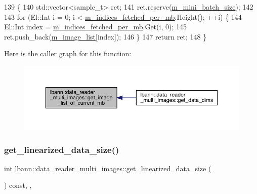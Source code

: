 \begin{DoxyCode}
139                                                                                                          \{
140   std::vector<sample\_t> ret;
141   ret.reserve(\hyperlink{classlbann_1_1generic__data__reader_a96f87a7d09711ab3eee3940ff2aa36ec}{m\_mini\_batch\_size});
142 
143   \textcolor{keywordflow}{for} (El::Int i = 0; i < \hyperlink{classlbann_1_1generic__data__reader_a4ee1a159c74561c15a5e0c267ad3cc6a}{m\_indices\_fetched\_per\_mb}.Height(); ++i) \{
144     El::Int index = \hyperlink{classlbann_1_1generic__data__reader_a4ee1a159c74561c15a5e0c267ad3cc6a}{m\_indices\_fetched\_per\_mb}.Get(i, 0);
145     ret.push\_back(\hyperlink{classlbann_1_1data__reader__multi__images_a6d8e2d161c9efff1ac70f847b4a7e9d0}{m\_image\_list}[index]);
146   \}
147   \textcolor{keywordflow}{return} ret;
148 \}
\end{DoxyCode}
Here is the caller graph for this function\+:\nopagebreak
\begin{figure}[H]
\begin{center}
\leavevmode
\includegraphics[width=350pt]{classlbann_1_1data__reader__multi__images_a6328561103138b60f22dbd927186f7d2_icgraph}
\end{center}
\end{figure}
\mbox{\label{classlbann_1_1data__reader__multi__images_a63d7c8f0b674f19840134ee99680f3fc}} 
\subsubsection{\texorpdfstring{get\+\_\+linearized\+\_\+data\+\_\+size()}{get\_linearized\_data\_size()}}
{\footnotesize\ttfamily int lbann\+::data\+\_\+reader\+\_\+multi\+\_\+images\+::get\+\_\+linearized\+\_\+data\+\_\+size (\begin{DoxyParamCaption}{ }\end{DoxyParamCaption}) const\hspace{0.3cm}{\ttfamily [inline]}, {\ttfamily [override]}, {\ttfamily [virtual]}}



